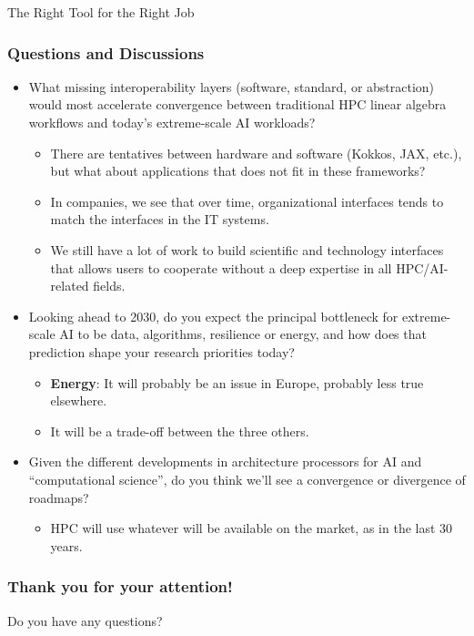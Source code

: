 \documentclass[10pt,aspectratio=1609]{beamer}
\begin{document}
\begin{section}{The Right Tool for the Right Job}
 \begin{frame}
   \frametitle{Questions and Discussions}
   \begin{itemize}
     \item What missing interoperability layers (software, standard, or abstraction) would most accelerate convergence between traditional HPC linear algebra workflows and today's extreme-scale AI workloads?
           \begin{itemize}
             \item There are tentatives between hardware and software (Kokkos, JAX, etc.), but what about applications that does not fit in these frameworks?
             \item In companies, we see that over time, organizational interfaces tends to match the interfaces in the IT systems.
             \item We still have a lot of work to build scientific and technology interfaces that allows users to cooperate without a deep expertise in all HPC/AI-related fields.
           \end{itemize}
     \item Looking ahead to 2030, do you expect the principal bottleneck for extreme-scale AI to be data, algorithms, resilience or energy, and how does that prediction shape your research priorities today?
           \begin{itemize}
             \item \textbf{Energy}: It will probably be an issue in Europe, probably less true elsewhere.
             \item It will be a trade-off between the three others.
           \end{itemize}
     \item Given the different developments in architecture processors for AI and “computational science”, do you think we'll see a convergence or divergence of roadmaps?
           \begin{itemize}
             \item HPC will use whatever will be available on the market, as in the last 30 years.
           \end{itemize}
   \end{itemize}
 \end{frame}

 \begin{frame}
   \frametitle{Thank you for your attention!}
   Do you have any questions?
 \end{frame}
\end{section}
\end{document}
